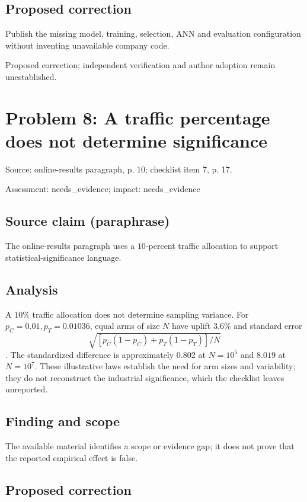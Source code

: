 \documentclass[11pt]{article}
\begin{document}
\subsection*{Proposed correction}

Publish the missing model, training, selection, ANN and evaluation configuration without inventing unavailable company code.

Proposed correction; independent verification and author adoption remain unestablished.

\section*{Problem 8: A traffic percentage does not determine significance}

Source: online-results paragraph, p. 10; checklist item 7, p. 17.

Assessment: needs\_evidence; impact: needs\_evidence

\subsection*{Source claim (paraphrase)}

The online-results paragraph uses a \(10\)-percent traffic allocation to support statistical-significance language.

\subsection*{Analysis}

A \(10\%\) traffic allocation does not determine sampling variance. For \(p_C=0.01,p_T=0.01036\), equal arms of size \(N\) have uplift \(3.6\%\) and standard error \[\sqrt{[p_C(1-p_C)+p_T(1-p_T)]/N}\]. The standardized difference is approximately \(0.802\) at \(N=10^5\) and \(8.019\) at \(N=10^7\). These illustrative laws establish the need for arm sizes and variability; they do not reconstruct the industrial significance, which the checklist leaves unreported.

\subsection*{Finding and scope}

The available material identifies a scope or evidence gap; it does not prove that the reported empirical effect is false.

\subsection*{Proposed correction}
\end{document}
